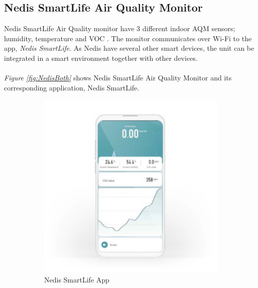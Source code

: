\subsection{Nedis SmartLife Air Quality Monitor}
Nedis SmartLife Air Quality monitor have 3 different indoor AQM sensors; humidity, temperature and VOC \cite{NedisDevice}. The monitor communicates over Wi-Fi to the app, \textit{Nedis SmartLife}. As Nedis have several other smart devices, the unit can be integrated in a smart environment together with other devices. 
\\\\
\textit{Figure \ref{fig:NedisBoth}} shows Nedis SmartLife Air Quality Monitor and its corresponding application, Nedis SmartLife. 
\begin{figure} [!ht]
    \centering
    \begin{subfigure}{0.3\textwidth}
         \centering
         \includegraphics[width=1.5\textwidth]{figures/NedisApp.jpg}
         \caption{Nedis SmartLife App \cite{Nedis}}
         \label{fig:NedisApp}
     \end{subfigure}
     \hfill
      \begin{subfigure}{0.3\textwidth}
         \centering

\end{subfigure}
\end{figure}
